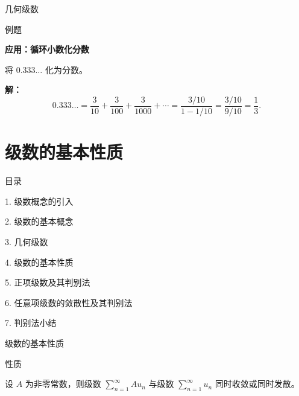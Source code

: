 \documentclass[aspectratio=169,10pt,fontset=fandol]{ctexbeamer}
\begin{document}
\begin{frame}[t,fragile]{几何级数}
\normalsize
\begin{block}{例题}
{\normalsize
\textbf{应用：循环小数化分数}\par

将 \(0.333\ldots\) 化为分数。

}
\end{block}
\pause
{\normalsize
\textbf{解：}
\[
0.333\ldots = \dfrac{3}{10} + \dfrac{3}{100} + \dfrac{3}{1000} + \cdots = \dfrac{3/10}{1-1/10} = \dfrac{3/10}{9/10} = \dfrac{1}{3}.
\]

}
\end{frame}
\section{级数的基本性质}
\begin{frame}[t,fragile]{目录}
\normalsize
{\color{black}\normalsize 1. 级数概念的引入\par}\vspace{0.22em}
{\color{black}\normalsize 2. 级数的基本概念\par}\vspace{0.22em}
{\color{black}\normalsize 3. 几何级数\par}\vspace{0.22em}
{\color{blue}\normalsize 4. 级数的基本性质\par}\vspace{0.22em}
{\color{gray!40}\normalsize 5. 正项级数及其判别法\par}\vspace{0.22em}
{\color{gray!40}\normalsize 6. 任意项级数的敛散性及其判别法\par}\vspace{0.22em}
{\color{gray!40}\normalsize 7. 判别法小结\par}\vspace{0.22em}
\end{frame}
\begin{frame}[t,fragile]{级数的基本性质}
\normalsize
\begin{block}{性质}
{\normalsize
设 $A$ 为非零常数，则级数 $\sum\limits_{n = 1}^{  \infty } A u_n$ 与级数 $\sum\limits_{n = 1}^{  \infty } u_n$ 同时收敛或同时发散。

}
\end{block}
\end{frame}
\end{document}
